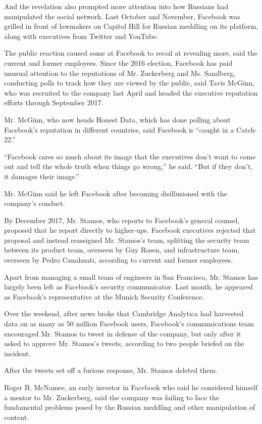 And the revelation also prompted more attention into how Russians had
manipulated the social network. Last October and November, Facebook was
grilled in front of lawmakers on Capitol Hill for Russian meddling on
its platform, along with executives from Twitter and YouTube.

The public reaction caused some at Facebook to recoil at revealing more,
said the current and former employees. Since the 2016 election, Facebook
has paid unusual attention to the reputations of Mr. Zuckerberg and Ms.
Sandberg, conducting polls to track how they are viewed by the public,
said Tavis McGinn, who was recruited to the company last April and
headed the executive reputation efforts through September 2017.

Mr. McGinn, who now heads Honest Data, which has done polling about
Facebook's reputation in different countries, said Facebook is ``caught
in a Catch-22.''

``Facebook cares so much about its image that the executives don't want
to come out and tell the whole truth when things go wrong,'' he said.
``But if they don't, it damages their image.''

Mr. McGinn said he left Facebook after becoming disillusioned with the
company's conduct.

By December 2017, Mr. Stamos, who reports to Facebook's general counsel,
proposed that he report directly to higher-ups. Facebook executives
rejected that proposal and instead reassigned Mr. Stamos's team,
splitting the security team between its product team, overseen by Guy
Rosen, and infrastructure team, overseen by Pedro Canahuati, according
to current and former employees.

Apart from managing a small team of engineers in San Francisco, Mr.
Stamos has largely been left as Facebook's security communicator. Last
month, he appeared as Facebook's representative at the Munich Security
Conference.

Over the weekend, after news broke that Cambridge Analytica had
harvested data on as many as 50 million Facebook users, Facebook's
communications team encouraged Mr. Stamos to tweet in defense of the
company, but only after it asked to approve Mr. Stamos's tweets,
according to two people briefed on the incident.

After the tweets set off a furious response, Mr. Stamos deleted them.

Roger B. McNamee, an early investor in Facebook who said he considered
himself a mentor to Mr. Zuckerberg, said the company was failing to face
the fundamental problems posed by the Russian meddling and other
manipulation of content.

